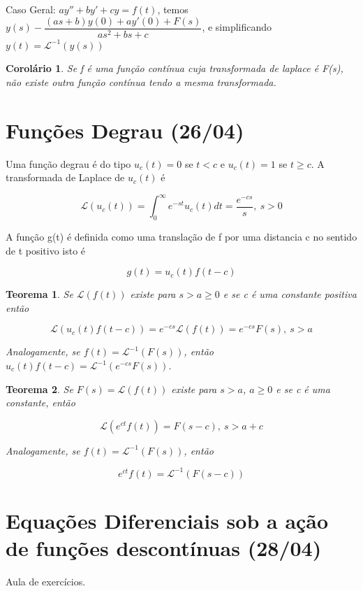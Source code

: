 \documentclass[12pt]{article}
\newtheorem{theorem}{Teorema}[section]
\newtheorem{corollary}{Corolário}[theorem]
\begin{document}
Caso Geral: $a y'' + b y' + c y = f(t)$, temos $y(s) - \dfrac{(as + b)y(0) + a y'(0) + F(s)}{as^2 + b s + c}$, e simplificando $y(t) = \mathscr{L}^{-1} (y(s))$

\begin{corollary}
    Se f é uma função contínua cuja transformada de laplace é F(s), não existe outra função contínua tendo a mesma transformada. 
\end{corollary}

\section{Funções Degrau (26/04)}
Uma função degrau é do tipo $u_c (t) = 0$ se $t < c$ e $u_c (t) = 1$ se $t \geq c$. A transformada de Laplace de $u_c(t)$ é

$$\mathscr{L}(u_c (t)) = \int_0^\infty e^{-s t} u_c(t) d t = \frac{e^{-c s}}{s}, \ s > 0$$

A função g(t) é definida como uma translação de f por uma distancia c no sentido de t positivo isto é 

$$g(t) = u_c(t) f(t-c)$$

\begin{theorem}
    Se $\mathscr{L}(f(t))$ existe para $s > a \geq 0$ e se c é uma constante positiva então
    
    $$\mathscr{L}(u_c(t) f(t - c)) = e^{-cs} \mathscr{L}(f(t)) = e^{-cs} F(s), \ s > a$$
    
    Analogamente, se $f(t) = \mathscr{L}^{-1} (F(s))$, então $u_c(t) f(t-c) = \mathscr{L}^{-1} (e^{-c s} F(s))$.
\end{theorem}

\begin{theorem}
    Se $F(s) = \mathscr{L}(f(t))$ existe para $s > a$, $a \geq 0$ e se c é uma constante, então
    
    $$\mathscr{L}(e^{ct} f(t)) = F(s-c), \ s > a + c$$
    
    Analogamente, se $f(t) = \mathscr{L}^{-1} (F(s))$, então
    
    $$e^{c t} f(t) = \mathscr{L}^{-1} (F(s - c))$$
\end{theorem}

\section{Equações Diferenciais sob a ação de funções descontínuas (28/04)}

Aula de exercícios.
\end{document}
